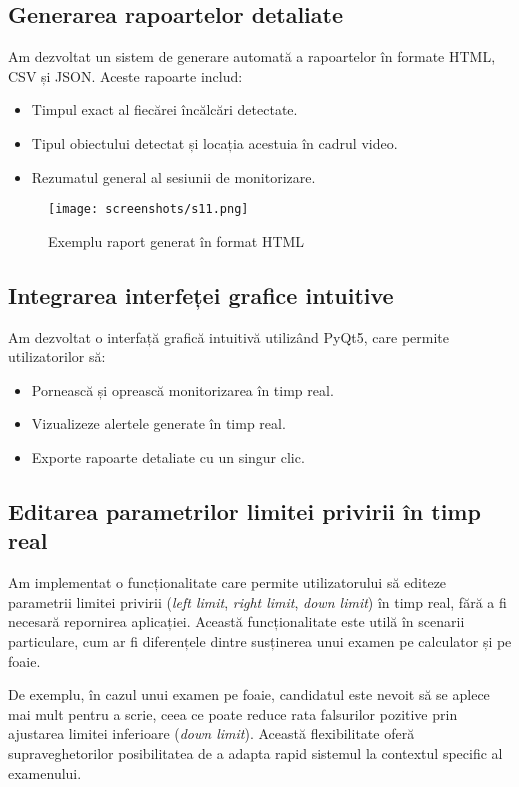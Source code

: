 \documentclass[12pt,a4paper]{article}
\begin{document}
\subsection{Generarea rapoartelor detaliate}
Am dezvoltat un sistem de generare automată a rapoartelor în formate HTML, CSV și JSON. Aceste rapoarte includ:
\begin{itemize}
    \item Timpul exact al fiecărei încălcări detectate.
    \item Tipul obiectului detectat și locația acestuia în cadrul video.
    \item Rezumatul general al sesiunii de monitorizare.
\end{itemize}

\begin{figure}[H]
    \centering
    \texttt{[image: screenshots/s11.png]}
    \caption{Exemplu raport generat în format HTML} 
\end{figure}

\subsection{Integrarea interfeței grafice intuitive}
Am dezvoltat o interfață grafică intuitivă utilizând PyQt5, care permite utilizatorilor să:
\begin{itemize}
    \item Pornească și oprească monitorizarea în timp real.
    \item Vizualizeze alertele generate în timp real.
    \item Exporte rapoarte detaliate cu un singur clic.
\end{itemize}

\subsection{Editarea parametrilor limitei privirii în timp real}
Am implementat o funcționalitate care permite utilizatorului să editeze parametrii limitei privirii (\textit{left limit}, \textit{right limit}, \textit{down limit}) în timp real, fără a fi necesară repornirea aplicației. Această funcționalitate este utilă în scenarii particulare, cum ar fi diferențele dintre susținerea unui examen pe calculator și pe foaie. 

De exemplu, în cazul unui examen pe foaie, candidatul este nevoit să se aplece mai mult pentru a scrie, ceea ce poate reduce rata falsurilor pozitive prin ajustarea limitei inferioare (\textit{down limit}). Această flexibilitate oferă supraveghetorilor posibilitatea de a adapta rapid sistemul la contextul specific al examenului.
\end{document}
